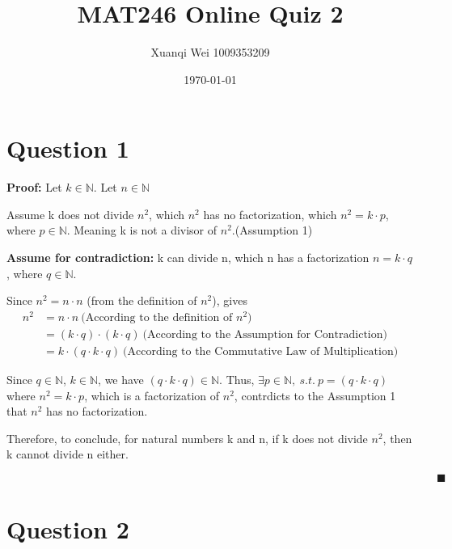 \documentclass[12pt]{article}
\title{MAT246 Online Quiz 2}
\author{Xuanqi Wei 1009353209}
\date{\today}
\begin{document}
\maketitle
\thispagestyle{empty}

\newpage

\setcounter{page}{1}

\section{Question 1}

\textbf{Proof:} Let $k \in \mathbb{N}$. Let $n \in \mathbb{N}$

\noindent Assume k does not divide $n^2$, which $n^2$ has no factorization, which $n^2 = k \cdot p$, where $p \in \mathbb{N}$.
Meaning k is not a divisor of $n^2$.(Assumption 1)

\noindent \textbf{Assume for contradiction:} k can divide n, which n has a factorization $n = k \cdot q$, where $q \in \mathbb{N}$.

\noindent Since $n^2 = n \cdot n$ (from the definition of $n^2$), gives
\begin{align*}
    n^2 &= n \cdot n\ \text{(According to the definition of $n^2$)} \\
    &= (k \cdot q) \cdot (k \cdot q) \ \text{(According to the Assumption for Contradiction)} \\
    &= k \cdot (q \cdot k \cdot q) \ \text{(According to the Commutative Law of Multiplication)}
\end{align*}

\noindent Since $q \in \mathbb{N}$, $k \in \mathbb{N}$, we have $(q \cdot k \cdot q) \in \mathbb{N}$.
Thus, $\exists p \in \mathbb{N},\ s.t.\ p=(q \cdot k \cdot q)$ where $n^2 = k \cdot p $, which is a factorization of $n^2$, contrdicts to the Assumption 1 that $n^2$ has no factorization.

\noindent Therefore, to conclude, for natural numbers k and n, if k does not divide $n^2$, then k cannot divide n either.

$\quad \quad \quad \quad \quad \quad \quad \quad \quad \quad \quad \quad \quad \quad \quad \quad \quad \quad \quad \quad \quad \quad \quad \quad \quad \quad \quad \quad \quad \quad \quad \quad \quad \quad \quad \quad \quad \quad  \blacksquare $

\section{Question 2}
\end{document}
